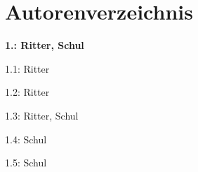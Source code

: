 \documentclass[12pt]{report}
\begin{document}
\section{Autorenverzeichnis}
\begin{center}

\begin{multicols}{2}
\begin{compactitem}
\item[] \textbf{1.: Ritter, Schul}

\begin{compactitem}
\item[] 1.1: Ritter
\item[] 1.2: Ritter
\item[] 1.3: Ritter, Schul
\item[] 1.4: Schul
\item[] 1.5: Schul
\end{compactitem}


\end{compactitem}
\end{multicols}
\end{center}
\end{document}

